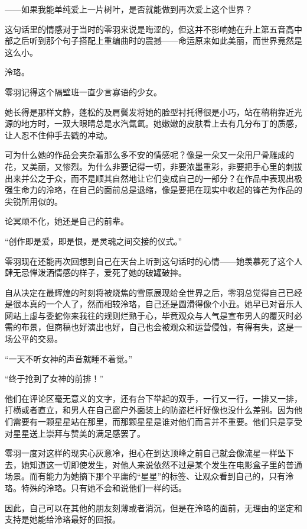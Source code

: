 \documentclass[UTF8, scheme = chinese, openany]{ctexbook}
\begin{document}
——如果我能单纯爱上一片树叶，是否就能做到再次爱上这个世界？

这句话里的情感对于当时的零羽来说是晦涩的，但这并不影响她在升上第五音高中部之后听到那个句子搭配上重编曲时的震撼——命运原来如此美丽，而世界竟然是这么小。

泠珞。

零羽记得这个隔壁班一直少言寡语的少女。

她长得是那样文静，蓬松的及肩鬓发将她的脸型衬托得很是小巧，站在稍稍靠近光源的地方时，一双大眼睛总是水汽氤氲。她嫩嫩的皮肤看上去有几分布丁的质感，让人忍不住伸手去戳的冲动。

可为什么她的作品会夹杂着那么多不安的情感呢？像是一朵又一朵用尸骨雕成的花，又美丽，又惨烈。为什么非要记得一切，非要浓墨重彩，非要把手心里的刺拔出来并公之于众，而不是顺其自然地让它们变成自己的一部分？在作品中表现出极强生命力的泠珞，在自己的面前总是退缩，像是要把在现实中收起的锋芒为作品的尖锐所用似的。

论冥顽不化，她还是自己的前辈。

“创作即是爱，即是恨，是灵魂之间交接的仪式。”

零羽现在还能再次回想到自己在天台上听到这句话时的心情——她羡慕死了这个人肆无忌惮泼洒情感的样子，爱死了她的破罐破摔。

自从决定在最辉煌的时刻将被烧焦的雪原展现给全世界之后，零羽总觉得自己已经是很本真的一个人了，然而相较泠珞，自己还是圆滑得像个小丑。她早已对音乐人网站上虚与委蛇你来我往的规则烂熟于心，毕竟观众与人气是宣布男人的覆灭时必需的布景，但商稿也好演出也好，自己也会被观众和运营侵蚀，有得有失，这是一场公平的交易。

“一天不听女神的声音就睡不着觉。”

“终于抢到了女神的前排！”

他们在评论区毫无意义的文字，还有台下举起的双手，一行又一行，一排又一排，打横或者直立，和男人在自己窗户外面装上的防盗栏杆好像也没什么差别。因为他们需要有一颗星星站在那里，而那颗星星是谁对他们而言并不重要。他们只是享受对星星送上崇拜与赞美的满足感罢了。

零羽一度对这样的现实心灰意冷，担心在到达顶峰之前自己就会像流星一样坠下去，她知道这一切即使发生，对他人来说依然不过是某个发生在电影盒子里的普通场景。而有能力为她摘下那个平庸的“星星”的标签、让观众看到自己的，只有泠珞。特殊的泠珞。只有她不会和说他们一样的话。

因此，自己可以在其他的朋友刻薄或者消沉，但是在泠珞的面前，无理由的坚定和支持是她能给泠珞最好的回报。

\vspace{1.5em}
\end{document}
